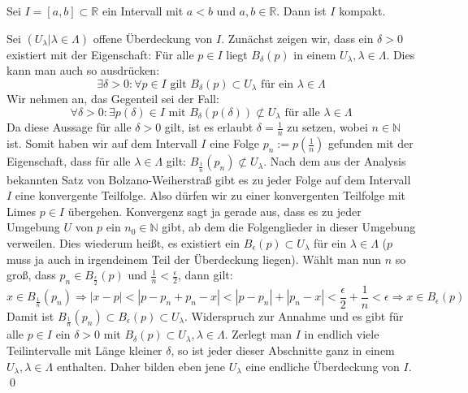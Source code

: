 \begin{Satz}\label{satz:intervall}
	Sei \(I = [ a , b ] \subset \mathbb{R}\) ein Intervall mit \(a<b\) und \(a,b \in \mathbb{R}\). Dann 
	ist \(I\) kompakt.
\end{Satz}
	Sei \( (U_{\lambda} | \lambda \in \Lambda) \) offene Überdeckung von \(I\). Zunächst zeigen wir,
	dass ein \(\delta > 0\) existiert mit der Eigenschaft: Für alle \(p \in I\) liegt \(B_{\delta}(p)\)
	in einem \(U_{\lambda}, \lambda \in \Lambda\). Dies kann man auch so ausdrücken: 
	\[ \exists \delta > 0 : \forall p \in I \mbox{ gilt } B_{\delta}(p) \subset U_{\lambda} \mbox { für ein } \lambda \in \Lambda \]
	Wir nehmen an, das Gegenteil sei der Fall:
	\[ \forall \delta > 0 : \exists p(\delta) \in I \mbox{ mit } B_{\delta}(p(\delta)) \not\subset U_{\lambda} \mbox { für alle } \lambda \in \Lambda \]
	Da diese Aussage für alle \(\delta > 0\) gilt, ist es erlaubt \(\delta = \frac{1}{n}\) zu setzen, wobei \(n \in \mathbb{N}\) ist.
	Somit haben wir auf dem Intervall \(I\) eine Folge \(p_{n} := p(\frac{1}{n})\) gefunden mit der Eigenschaft, dass für alle \(\lambda \in \Lambda\)
	gilt: \(B_{\frac{1}{n}}(p_{n}) \not\subset U_{\lambda}\). Nach dem aus der Analysis bekannten Satz von Bolzano-Weiherstraß gibt
	es zu jeder Folge auf dem Intervall \(I\) eine konvergente Teilfolge. Also dürfen wir zu einer konvergenten Teilfolge mit Limes \(p \in I\) übergehen.
  Konvergenz sagt ja gerade aus, dass es zu jeder Umgebung \(U\) von \(p\) ein \(n_0 \in \mathbb{N}\) gibt, 
	ab dem die Folgenglieder in dieser Umgebung verweilen. Dies wiederum heißt, es existiert ein \(B_{\epsilon}(p) \subset U_{\lambda}\) für ein \(\lambda \in \Lambda\)
	(\(p\) muss ja auch in irgendeinem Teil der Überdeckung liegen). Wählt man nun \(n\) so groß, dass \(p_n \in B_{\frac{\epsilon}{2}}(p)\) und \(\frac{1}{n} < \frac{\epsilon}{2}\),
	dann gilt:
	\[ x \in B_{\frac{1}{n}}(p_n) \Rightarrow |x-p| < |p-p_n+p_n-x| < |p-p_n| + |p_n-x| < \frac{\epsilon}{2} + \frac{1}{n} < \epsilon \Rightarrow x \in B_{\epsilon}(p) \]
	Damit ist \(B_{\frac{1}{n}}(p_n) \subset B_{\epsilon}(p) \subset U_{\lambda}\).
	Widerspruch zur Annahme und es gibt für alle \(p \in I\) ein \(\delta > 0\) mit \(B_{\delta}(p) \subset U_{\lambda}, \lambda \in \Lambda\).
	Zerlegt man \(I\) in endlich viele Teilintervalle mit Länge kleiner \(\delta\), so ist jeder dieser Abschnitte ganz in einem \(U_{\lambda}, \lambda \in \Lambda\)
	enthalten. Daher bilden eben jene \(U_{\lambda}\) eine endliche Überdeckung von \(I\).
\qed

